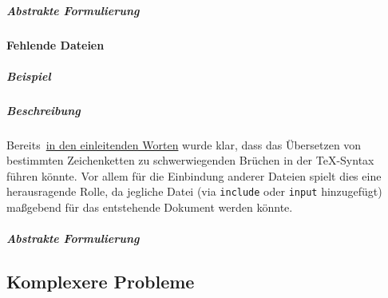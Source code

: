 \subparagraph*{Abstrakte Formulierung}


\paragraph*{Fehlende Dateien}%
\subparagraph*{Beispiel}
\subparagraph*{Beschreibung}
Bereits~\hyperref[einleitung:tex]{in den einleitenden Worten} wurde klar, dass das Übersetzen von bestimmten Zeichenketten zu schwerwiegenden Brüchen in der \TeX{}-Syntax führen könnte. Vor allem für die Einbindung anderer Dateien spielt dies eine herausragende Rolle, da jegliche Datei (via \texttt{include} oder \texttt{input} hinzugefügt) maßgebend für das entstehende Dokument werden könnte.


\subparagraph*{Abstrakte Formulierung}



\newpage
\subsection{Komplexere Probleme}



